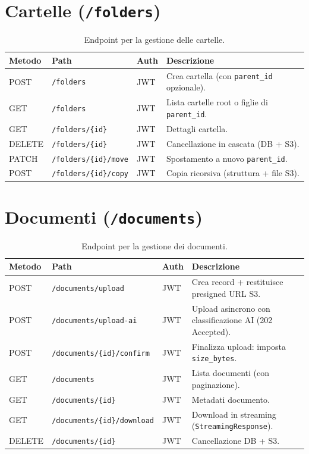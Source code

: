 \section{Cartelle (\texttt{/folders})}
\label{sec:api_folders}

\begin{table}[ht]
\centering
\small
\begin{tabularx}{\linewidth}{l l l X}
\toprule
\textbf{Metodo} & \textbf{Path} & \textbf{Auth} & \textbf{Descrizione} \\
\midrule
POST  & \texttt{/folders}             & JWT & Crea cartella (con \texttt{parent\_id} opzionale). \\
GET   & \texttt{/folders}             & JWT & Lista cartelle root o figlie di \texttt{parent\_id}. \\
GET   & \texttt{/folders/\{id\}}      & JWT & Dettagli cartella. \\
DELETE & \texttt{/folders/\{id\}}     & JWT & Cancellazione in cascata (DB + S3). \\
PATCH & \texttt{/folders/\{id\}/move} & JWT & Spostamento a nuovo \texttt{parent\_id}. \\
POST  & \texttt{/folders/\{id\}/copy} & JWT & Copia ricorsiva (struttura + file S3). \\
\bottomrule
\end{tabularx}
\caption{Endpoint per la gestione delle cartelle.}
\end{table}

\section{Documenti (\texttt{/documents})}
\label{sec:api_documents}

\begin{table}[ht]
\centering
\small
\begin{tabularx}{\linewidth}{l l l X}
\toprule
\textbf{Metodo} & \textbf{Path} & \textbf{Auth} & \textbf{Descrizione} \\
\midrule
POST & \texttt{/documents/upload}         & JWT & Crea record + restituisce presigned URL S3. \\
POST & \texttt{/documents/upload-ai}      & JWT & Upload asincrono con classificazione AI (202 Accepted). \\
POST & \texttt{/documents/\{id\}/confirm} & JWT & Finalizza upload: imposta \texttt{size\_bytes}. \\
GET  & \texttt{/documents}                & JWT & Lista documenti (con paginazione). \\
GET  & \texttt{/documents/\{id\}}         & JWT & Metadati documento. \\
GET  & \texttt{/documents/\{id\}/download}& JWT & Download in streaming (\texttt{StreamingResponse}). \\
DELETE & \texttt{/documents/\{id\}}       & JWT & Cancellazione DB + S3. \\
\bottomrule
\end{tabularx}
\caption{Endpoint per la gestione dei documenti.}
\end{table}

